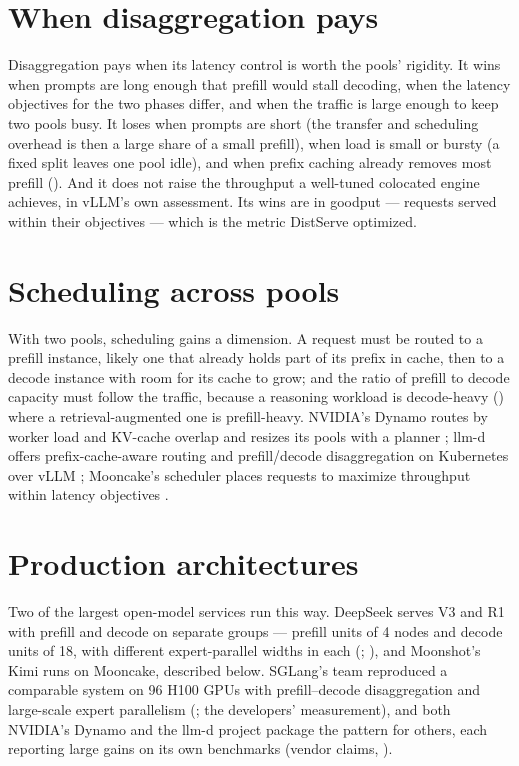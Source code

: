\section{When disaggregation pays}

Disaggregation pays when its latency control is worth the pools' rigidity. It
wins when prompts are long enough that prefill would stall decoding, when the
latency objectives for the two phases differ, and when the traffic is large
enough to keep two pools busy. It loses when prompts are short (the transfer
and scheduling overhead is then a large share of a small prefill), when load is
small or bursty (a fixed split leaves one pool idle), and when prefix caching
already removes most prefill (). And it does not raise the
throughput a well-tuned colocated engine achieves, in vLLM's own assessment. Its
wins are in goodput --- requests served within their objectives --- which is
the metric DistServe optimized.

\section{Scheduling across pools}

With two pools, scheduling gains a dimension. A request must be routed to a
prefill instance, likely one that already holds part of its prefix in cache,
then to a decode instance with room for its cache to grow; and the ratio of
prefill to decode capacity must follow the traffic, because a reasoning
workload is decode-heavy () where a
retrieval-augmented one is prefill-heavy. NVIDIA's Dynamo routes by worker load
and KV-cache overlap and resizes its pools with a planner \cite{nvidia2026dynamo};
llm-d offers prefix-cache-aware routing and prefill/decode disaggregation on
Kubernetes over vLLM \cite{llmd2026}; Mooncake's scheduler places requests to
maximize throughput within latency objectives \cite{qin2024mooncake}.

\section{Production architectures}

Two of the largest open-model services run this way. DeepSeek serves
V3 and R1 with prefill and decode on separate groups --- prefill units of 4
nodes and decode units of 18, with different expert-parallel widths in each
(\cite{deepseek2025inference}; ), and Moonshot's
Kimi runs on Mooncake, described below. SGLang's team
reproduced a comparable system on 96 H100 GPUs with prefill--decode
disaggregation and large-scale expert parallelism (\cite{sglang2025largeep};
the developers' measurement), and both NVIDIA's Dynamo and the llm-d project
package the pattern for others, each reporting large gains on its own
benchmarks (vendor claims, \cite{nvidia2026dynamo,llmd2026}).


